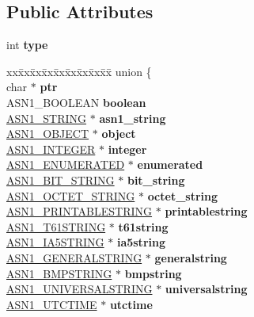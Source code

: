 \subsection*{Public Attributes}
\begin{DoxyCompactItemize}
\item 
\mbox{\label{structasn1__type__st_af1bd6ef16c406f3cd3fa67eb81693b54}} 
int {\bfseries type}
\item 
\mbox{\label{structasn1__type__st_a7a133b8149546dd1d7a4bc5b14697c64}} 
\begin{tabbing}
xx\=xx\=xx\=xx\=xx\=xx\=xx\=xx\=xx\=\kill
union \{\\
\>char $\ast$ {\bfseries ptr}\\
\>ASN1\_BOOLEAN {\bfseries boolean}\\
\>\hyperlink{structasn1__string__st}{ASN1\_STRING} $\ast$ {\bfseries asn1\_string}\\
\>\hyperlink{structasn1__object__st}{ASN1\_OBJECT} $\ast$ {\bfseries object}\\
\>\hyperlink{structasn1__string__st}{ASN1\_INTEGER} $\ast$ {\bfseries integer}\\
\>\hyperlink{structasn1__string__st}{ASN1\_ENUMERATED} $\ast$ {\bfseries enumerated}\\
\>\hyperlink{structasn1__string__st}{ASN1\_BIT\_STRING} $\ast$ {\bfseries bit\_string}\\
\>\hyperlink{structasn1__string__st}{ASN1\_OCTET\_STRING} $\ast$ {\bfseries octet\_string}\\
\>\hyperlink{structasn1__string__st}{ASN1\_PRINTABLESTRING} $\ast$ {\bfseries printablestring}\\
\>\hyperlink{structasn1__string__st}{ASN1\_T61STRING} $\ast$ {\bfseries t61string}\\
\>\hyperlink{structasn1__string__st}{ASN1\_IA5STRING} $\ast$ {\bfseries ia5string}\\
\>\hyperlink{structasn1__string__st}{ASN1\_GENERALSTRING} $\ast$ {\bfseries generalstring}\\
\>\hyperlink{structasn1__string__st}{ASN1\_BMPSTRING} $\ast$ {\bfseries bmpstring}\\
\>\hyperlink{structasn1__string__st}{ASN1\_UNIVERSALSTRING} $\ast$ {\bfseries universalstring}\\
\>\hyperlink{structasn1__string__st}{ASN1\_UTCTIME} $\ast$ {\bfseries utctime}\\

\end{tabbing}
\end{DoxyCompactItemize}
